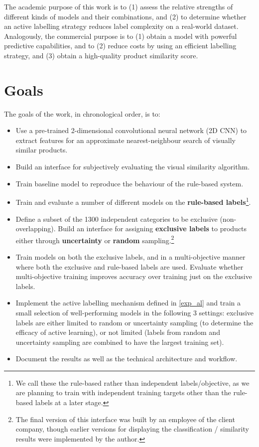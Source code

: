 The academic purpose of this work is to (1) assess the relative strengths of different kinds of models and their combinations, and (2) to determine whether an active labelling strategy reduces label complexity on a real-world dataset. Analogously, the commercial purpose is to (1) obtain a model with powerful predictive capabilities, and to (2) reduce costs by using an efficient labelling strategy, and (3) obtain a high-quality product similarity score.

\section{Goals}

The goals of the work, in chronological order, is to:

\begin{itemize}
  \item Use a pre-trained 2-dimensional convolutional neural network (2D CNN) to extract features for an approximate nearest-neighbour search of visually similar products.
  \item Build an interface for subjectively evaluating the visual similarity algorithm.
  \item Train  baseline model to reproduce the behaviour of the rule-based system.
  \item Train and evaluate a number of different models on the \textbf{rule-based labels}\footnote{We call these the rule-based rather than independent labels/objective, as we are planning to train with independent training targets other than the rule-based labels at a later stage.}.
  \item
    Define a subset of the 1300 independent categories to be exclusive (non-overlapping).
    Build an interface for assigning \textbf{exclusive labels} to products either through \textbf{uncertainty} or \textbf{random} sampling.\footnote{The final version of this interface was built by an employee of the client company, though earlier versions for displaying the classification / similarity results were implemented by the author.}
  \item Train models on both the exclusive labels, and in a multi-objective manner where both the exclusive and rule-based labels are used. Evaluate whether multi-objective training improves accuracy over training just on the exclusive labels.
  \item Implement the active labelling mechanism defined in \ref{exp_al} and train a small selection of well-performing models in the following 3 settings: exclusive labels are either limited to random or uncertainty sampling (to determine the efficacy of active learning), or not limited (labels from random and uncertainty sampling are combined to have the largest training set).
  \item Document the results as well as the technical architecture and workflow.
\end{itemize}

